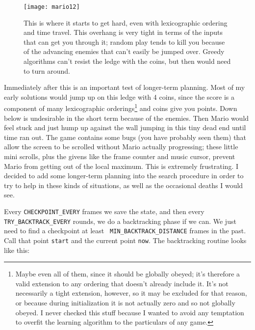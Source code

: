 \documentclass[twocolumn]{article}
\begin{document}
\begin{figure}[h!tb]
\begin{center}
\texttt{[image: mario12]}
\end{center}\vspace{-0.1in}
\caption{This is where it starts to get hard, even with lexicographic
ordering and time travel. This overhang is very tight in terms of the
inputs that can get you through it; random play tends to kill you because
of the advancing enemies that can't easily be jumped over. Greedy
algorithms can't resist the ledge with the coins, but then would need to
turn around.}
\label{fig:mario12}
\end{figure}

Immediately after this is an important test of longer-term planning.
Most of my early solutions would jump up on this ledge with 4 coins,
since the score is a component of many lexicographic
orderings\footnote{Maybe even all of them, since it should be globally
  obeyed; it's therefore a valid extension to any ordering that
  doesn't already include it. It's not necessarily a tight extension,
  however, so it may be excluded for that reason, or because during
  initialization it is not actually zero and so not globally obeyed. I
  never checked this stuff because I wanted to avoid any temptation to
  overfit the learning algorithm to the particulars of any game.} and
coins give you points. Down below is undesirable in the short term
because of the enemies. Then Mario would feel stuck and just hump up
against the wall jumping in this tiny dead end until time ran out. The
game contains some bugs (you have probably seen them) that allow the
screen to be scrolled without Mario actually progressing; these little
mini scrolls, plus the givens like the frame counter and music cursor,
prevent Mario from getting out of the local maximum. This is extremely
frustrating. I decided to add some longer-term planning into the
search procedure in order to try to help in these kinds of situations,
as well as the occasional deaths I would see.

Every {\tt CHECKPOINT\_EVERY} frames we save the state, and then every
{\tt TRY\_BACKTRACK\_EVERY} rounds, we do a backtracking phase if we
can. We just need to find a checkpoint at least {\tt
  MIN\_BACKTRACK\_DISTANCE} frames in the past. Call that point
{\tt start} and the current point {\tt now}. The backtracking
routine looks like this:
\end{document}
